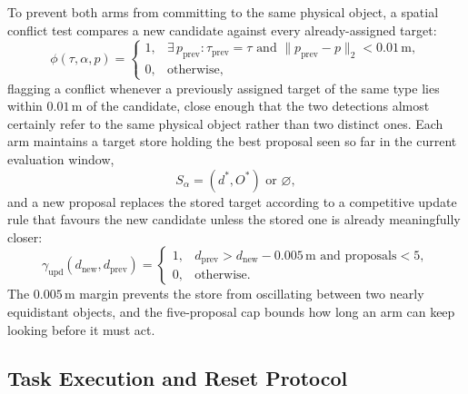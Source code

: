 To prevent both arms from committing to the same physical object, a spatial conflict test compares a
new candidate against every already-assigned target:
\begin{equation}
\phi(\tau, \alpha, p) =
\begin{cases}
1, & \exists\, p_{\text{prev}} : \tau_{\text{prev}} = \tau \text{ and } \lVert p_{\text{prev}} - p \rVert_2 < 0.01\,\text{m}, \\
0, & \text{otherwise},
\end{cases}
\label{eq:cta_conflict}
\end{equation}
flagging a conflict whenever a previously assigned target of the same type lies within $0.01$\,m of
the candidate, close enough that the two detections almost certainly refer to the same physical
object rather than two distinct ones. Each arm maintains a target store holding the best proposal
seen so far in the current evaluation window,
\begin{equation}
S_\alpha = (d^*, O^*) \text{ or } \varnothing,
\label{eq:cta_store}
\end{equation}
and a new proposal replaces the stored target according to a competitive update rule that favours
the new candidate unless the stored one is already meaningfully closer:
\begin{equation}
\gamma_{\text{upd}}(d_{\text{new}}, d_{\text{prev}}) =
\begin{cases}
1, & d_{\text{prev}} > d_{\text{new}} - 0.005\,\text{m} \text{ and proposals} < 5, \\
0, & \text{otherwise}.
\end{cases}
\label{eq:cta_update}
\end{equation}
The $0.005$\,m margin prevents the store from oscillating between two nearly equidistant objects,
and the five-proposal cap bounds how long an arm can keep looking before it must act.

\subsection{Task Execution and Reset Protocol}\label{subsec:cta_execution}

